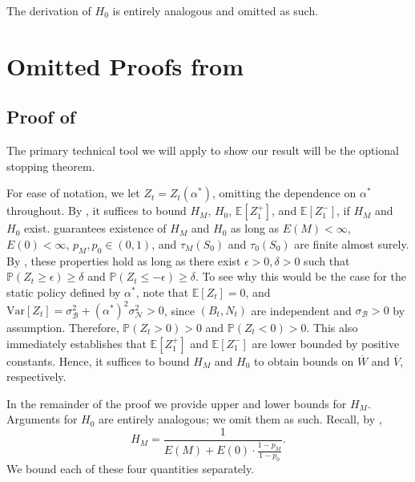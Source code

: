 \documentclass[mnsc,nonblindrev]{informs3}
\newcommand{\E}{\mathbb{E}}
\newcommand{\pr}{\mathbb{P}}
\renewcommand{\Pr}{\pr}
\newcommand{\NDist}{\mathcal{N}}
\newcommand{\BDist}{\mathcal{B}}
\newcommand{\Bstd}{\sigma_{\BDist}}
\newcommand{\Nstd}{\sigma_{\NDist}}
\newcommand{\Exp}[1]{\mathbb{E} \left[ #1 \right]} %
\newcommand{\Var}[1]{\mathrm{Var} \left[ #1 \right]} %
\renewenvironment{proof}[1][Proof]{%
  \par\noindent{\itshape #1.} \ignorespaces
}{%
  \hfill\Halmos\par
}
\begin{document}
\begin{APPENDICES}
\begin{proof}
The derivation of $H_0$ is entirely analogous and omitted as such.
\end{proof}
\section{Omitted Proofs from }\label{apx:static}

\subsection{Proof of }\label{apx:thm-2-proof}

The primary technical tool we will apply to show our result will be the optional stopping theorem.

\InefficiencyZeroMean*

\begin{proof}
For ease of notation, we let $Z_t = Z_t(\alpha^*)$, omitting the dependence on $\alpha^*$ throughout. 
By , it suffices to bound $H_M$, $H_0$, $\mathbb{E}[Z_1^+]$, and $\mathbb{E}[Z_1^-]$, if $H_M$ and $H_0$ exist.  guarantees existence of $H_M$ and $H_0$ as long as $E(M) < \infty$, $E(0) < \infty$, $p_M, p_0 \in (0,1)$, and $\tau_M(S_0)$ and $\tau_0(S_0)$ are finite almost surely. By , these properties hold as long as there exist $\epsilon > 0, \delta > 0$ such that $\Pr(Z_t \geq \epsilon) \geq \delta$ and $\Pr(Z_t \leq - \epsilon) \geq \delta$. To see why this would be the case for the static policy defined by $\alpha^*$, note that $\Exp{Z_t} = 0$, and $\Var{Z_t} = \Bstd^2 + (\alpha^*)^2 \Nstd^2 > 0$, since $(B_t, N_t)$ are independent and $\Bstd > 0$ by assumption. Therefore, $\Pr(Z_t > 0) > 0$ and $\Pr(Z_t < 0) > 0$. This also immediately establishes that $\E[Z_1^+]$ and $\E[Z_1^-]$ are lower bounded by positive constants. Hence, it suffices to bound $H_M$ and $H_0$ to obtain bounds on $\overline{W}$ and $\overline{V}$, respectively.

In the remainder of the proof we provide upper and lower bounds for $H_M$. Arguments for $H_0$ are entirely analogous; we omit them as such. Recall, by ,
\[H_M = \frac{1}{E(M) + E(0)\cdot \frac{1-p_{M}}{1-p_{0}}}.\]
We bound each of these four quantities separately.



\end{proof}
\end{APPENDICES}
\end{document}
